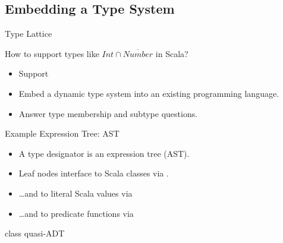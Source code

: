 \subsection{Embedding a Type System}

{  
\begin{frame}{ Type Lattice}

  How to support types like \textcolor{greeny}{$Int\cap\overline{Number}$} in Scala?

  \begin{itemize}
  \item Support 
  \item Embed a dynamic type system into an existing programming language.
  \item Answer type membership and subtype questions.
  \end{itemize}

\end{frame}
}



\newsavebox\tdast
\begin{lrbox}{\tdast}
  \begin{minipage}{11cm}
    
  \end{minipage}
\end{lrbox}


\begin{frame}{Example  Expression Tree: AST}
  \usebox\tdast

  \medskip

  \centering

  \scalebox{0.7}{}
  \begin{itemize}
  \item A type designator is an expression tree (AST).
  \item Leaf nodes interface to Scala classes via . 
  \item \ldots and to literal Scala values via 
  \item \ldots and to predicate functions via 
 \end{itemize}
\end{frame}


\begin{frame}{ class quasi-ADT}
  \scalebox{0.95}{}

\end{frame}


